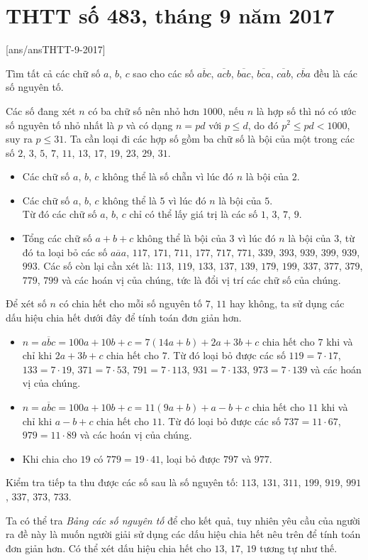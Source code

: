 \section{THTT số 483, tháng 9 năm 2017}
[ans/ansTHTT-9-2017]

\begin{bt}%
	Tìm tất cả các chữ số $a$, $b$, $c$ sao cho các số $\overline{abc}$, $\overline{acb}$, $\overline{bac}$, $\overline{bca}$, $\overline{cab}$, $\overline{cba}$ đều là các số nguyên tố.
	\loigiai
	{
		Các số đang xét $n$ có ba chữ số nên nhỏ hơn $1000$, nếu $n$ là hợp số thì nó có ước số nguyên tố nhỏ nhất là $p$ và có dạng $n=pd$ với $p\le d$, do đó $p^2\le pd< 1000$, suy ra $p\le 31$. Ta cần loại đi các hợp số gồm ba chữ số là bội của một trong các số $2$, $3$, $5$, $7$, $11$, $13$, $17$, $19$, $23$, $29$, $31$.
		\begin{itemize}
			\item Các chữ số $a$, $b$, $c$ không thể là số chẵn vì lúc đó $n$ là bội của $2$.
			\item Các chữ số $a$, $b$, $c$ không thể là $5$ vì lúc đó $n$ là bội của $5$.\\
			Từ đó các chữ số $a$, $b$, $c$ chỉ có thể lấy giá trị là các số $1$, $3$, $7$, $9$.
			\item Tổng các chữ số $a+b+c$ không thể là bội của $3$ vì lúc đó $n$ là bội của $3$, từ đó ta loại bỏ các số $\overline{aaa}$, $117$, $171$, $711$, $177$, $717$, $771$, $339$, $393$, $939$, $399$, $939$, $993$. Các số còn lại cần xét là: $113$, $119$, $133$, $137$, $139$, $179$, $199$, $337$, $377$, $379$, $779$, $799$ và các hoán vị của chúng, tức là đổi vị trí các chữ số của chúng.			
		\end{itemize}
	Để xét số $n$ có chia hết cho mỗi số nguyên tố $7$, $11$ hay không, ta sử dụng các dấu hiệu chia hết dưới đây để tính toán đơn giản hơn.
	\begin{itemize}
		\item $n=\overline{abc}=100a+10b+c=7(14a+b)+2a+3b+c$ chia hết cho $7$ khi và chỉ khi $2a+3b+c$ chia hết cho $7$. Từ đó loại bỏ được các số $119=7\cdot 17$, $133=7\cdot 19$, $371=7\cdot 53$, $791=7\cdot 113$, $931=7\cdot 133$, $973=7\cdot 139$ và các hoán vị của chúng.
		\item $n=\overline{abc}=100a+10b+c=11(9a+b)+a-b+c$ chia hết cho $11$ khi và chỉ khi $a-b+c$ chia hết cho $11$. Từ đó loại bỏ được các số $737=11\cdot 67$, $979=11\cdot 89$ và các hoán vị của chúng.
		\item Khi chia cho $19$ có $779=19\cdot 41$, loại bỏ được $797$ và $977$.
	\end{itemize}
	Kiểm tra tiếp ta thu được các số sau là số nguyên tố: $113$, $131$, $311$, $199$, $919$, $991$, $337$, $373$, $733$.
	\begin{nx}
		Ta có thể tra \textit{Bảng các số nguyên tố} để cho kết quả, tuy nhiên yêu cầu của người ra đề này là muốn người giải sử dụng các dấu hiệu chia hết nêu trên để tính toán đơn giản hơn. Có thể xét dấu hiệu chia hết cho $13$, $17$, $19$ tương tự như thế.
	\end{nx}
	} 
\end{bt}

